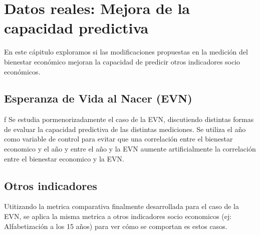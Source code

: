 \chapter{Datos reales: Mejora de la capacidad predictiva}

En este cápitulo exploramos si las modificaciones propuestas en la medición del bienestar económico mejoran la capacidad de predicir otros indicadores socio económicos.

\section{Esperanza de Vida al Nacer (EVN)}
f
Se estudia pormenorizadamente el caso de la EVN, discutiendo distintas formas de evaluar la capacidad predictiva de las distintas mediciones. Se utiliza el año como variable de control para evitar que una correlación entre el bienestar economico y el año y entre el año y la EVN aumente artificialmente la correlación entre el bienestar economico y la EVN.


\section{Otros indicadores}

Utitizando la metrica comparativa finalmente desarrollada para el caso de la EVN, se aplica la misma metrica a otros indicadores socio economicos (ej: Alfabetización a los 15 años) para ver cómo se comportan es estos casos.